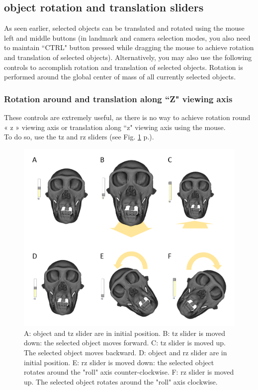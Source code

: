 \subsection{object rotation and translation sliders}
	As seen earlier, selected objects can be translated and rotated using the mouse left and middle buttons
(in landmark and camera selection modes, you also need to maintain ``CTRL" button pressed
while dragging the mouse to achieve rotation and translation of selected objects). Alternatively, you
may also use the following controls to accomplish rotation and translation of selected objects. Rotation
is performed around the global center of mass of all currently selected objects.

\subsubsection{Rotation around and translation along ``Z" viewing axis }

These controls are extremely useful, as there is no way to achieve rotation round « z » viewing axis or translation along ``z" viewing axis using the
mouse. \\ To do so, use the tz and rz sliders (see Fig. \ref{move_z} p.\pageref{move_z}).


\begin{figure}
  \centering
  \includegraphics[scale=0.45]{images/06/objects/move_objects_z.png} 
	\caption{A: object and tz slider are in initial position. B: tz slider is moved down: the selected object moves forward. C: tz slider is moved up. The selected object moves backward. D: object and rz slider are in initial position. E: rz slider is moved down: the selected object rotates around the "roll" axis counter-clockwise. F: rz slider is moved up. The selected object rotates around the "roll" axis clockwise.}
\label{move_z}
 
\end{figure}



